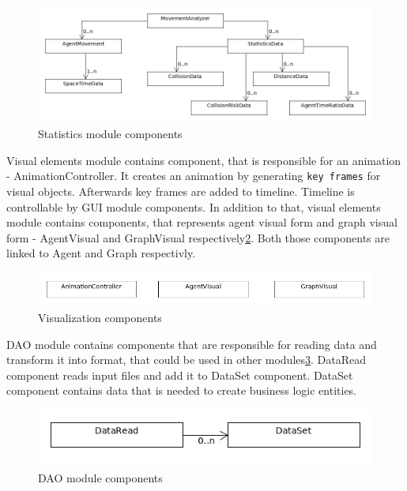 \documentclass[thesis=B,english]{FITthesis}[2019/12/23]
\begin{document}
\begin{figure}
	\includegraphics[scale=0.4]{Statistics.png}
	\caption[Statistics]{Statistics module components}\label{fig:float7}
\end{figure}

Visual elements module contains component, that is responsible for an animation - AnimationController. It creates an animation by generating \verb|key frames| for visual objects. Afterwards key frames are added to timeline. Timeline is controllable by GUI module components. In addition to that, visual elements module contains components, that represents agent visual form and graph visual form - AgentVisual and GraphVisual respectively\ref{fig:float8}. Both those components are linked to Agent and Graph respectivly.

\begin{figure}
	\includegraphics[scale=0.4]{Visualization.png}
	\caption[Visualization]{Visualization components}\label{fig:float8}
\end{figure}


DAO module contains components that are responsible for reading data and transform it into format, that could be used in other modules\ref{fig:float9}. DataRead component reads input files and add it to DataSet component. DataSet component contains data that is needed to create business logic entities.

\begin{figure}
	\includegraphics[scale=0.4]{DAO.png}
	\caption[DAO]{DAO module components}\label{fig:float9}
\end{figure}
\end{document}
